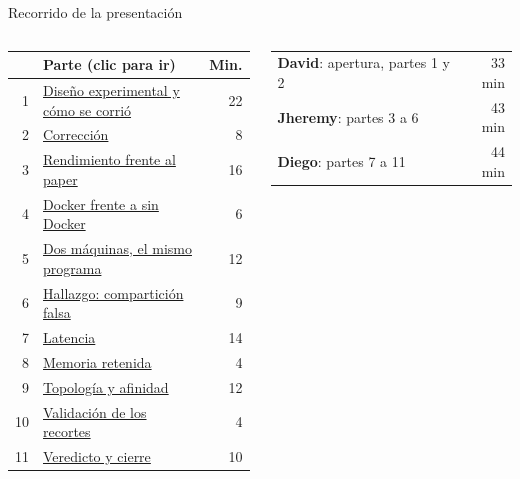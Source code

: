 \begin{frame}{Recorrido de la presentación}
  \begin{columns}[T]
    \small
    \renewcommand{\arraystretch}{1.08}
    \begin{tabular}{@{}rlr@{}}
      \toprule
      & Parte (clic para ir) & Min.\\
      \midrule
      1 & \hyperlink{parte1}{Diseño experimental y cómo se corrió} & 22\\
      2 & \hyperlink{parte2}{Corrección} & 8\\
      3 & \hyperlink{parte3}{Rendimiento frente al paper} & 16\\
      4 & \hyperlink{parte4}{Docker frente a sin Docker} & 6\\
      5 & \hyperlink{parte5}{Dos máquinas, el mismo programa} & 12\\
      6 & \hyperlink{parte6}{Hallazgo: compartición falsa} & 9\\
      7 & \hyperlink{parte7}{Latencia} & 14\\
      8 & \hyperlink{parte8}{Memoria retenida} & 4\\
      9 & \hyperlink{parte9}{Topología y afinidad} & 12\\
      10 & \hyperlink{parte10}{Validación de los recortes} & 4\\
      11 & \hyperlink{parte11}{Veredicto y cierre} & 10\\
      \bottomrule
    \end{tabular}
    \small
    \begin{tabular}{@{}lr@{}}
      \textbf{David}: apertura, partes 1 y 2 & 33 min\\[2pt]
      \textbf{Jheremy}: partes 3 a 6 & 43 min\\[2pt]
      \textbf{Diego}: partes 7 a 11 & 44 min\\
    \end{tabular}
    \par\bigskip
  \end{columns}
\end{frame}
